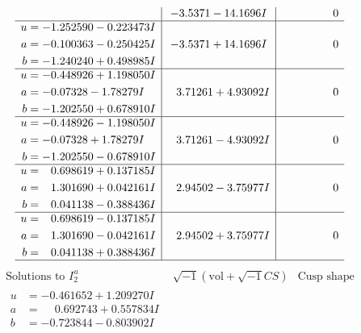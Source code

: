 \documentclass[1p]{elsarticle_modified}
\theoremstyle{definition}
\newcommand{\I}{\sqrt{-1}}
\begin{document}
$$\begin{array}{c|c|c}
 & -3.5371 - 14.1696 I & \phantom{-0.000000 } 0 \\ \hline\begin{aligned}
u &= -1.252590 - 0.223473 I \\
a &= -0.100363 - 0.250425 I \\
b &= -1.240240 + 0.498985 I\end{aligned}
 & -3.5371 + 14.1696 I & \phantom{-0.000000 } 0 \\ \hline\begin{aligned}
u &= -0.448926 + 1.198050 I \\
a &= -0.07328 - 1.78279 I \\
b &= -1.202550 + 0.678910 I\end{aligned}
 & \phantom{-}3.71261 + 4.93092 I & \phantom{-0.000000 } 0 \\ \hline\begin{aligned}
u &= -0.448926 - 1.198050 I \\
a &= -0.07328 + 1.78279 I \\
b &= -1.202550 - 0.678910 I\end{aligned}
 & \phantom{-}3.71261 - 4.93092 I & \phantom{-0.000000 } 0 \\ \hline\begin{aligned}
u &= \phantom{-}0.698619 + 0.137185 I \\
a &= \phantom{-}1.301690 + 0.042161 I \\
b &= \phantom{-}0.041138 - 0.388436 I\end{aligned}
 & \phantom{-}2.94502 - 3.75977 I & \phantom{-0.000000 } 0 \\ \hline\begin{aligned}
u &= \phantom{-}0.698619 - 0.137185 I \\
a &= \phantom{-}1.301690 - 0.042161 I \\
b &= \phantom{-}0.041138 + 0.388436 I\end{aligned}
 & \phantom{-}2.94502 + 3.75977 I & \phantom{-0.000000 } 0\\
 \hline 
 \end{array}$$\newpage$$\begin{array}{c|c|c}  
\text{Solutions to }I^u_{2}& \I (\text{vol} + \sqrt{-1}CS) & \text{Cusp shape}\\
 \hline 
\begin{aligned}
u &= -0.461652 + 1.209270 I \\
a &= \phantom{-}0.692743 + 0.557834 I \\
b &= -0.723844 - 0.803902 I\end{aligned}

\end{array}$$
\end{document}
